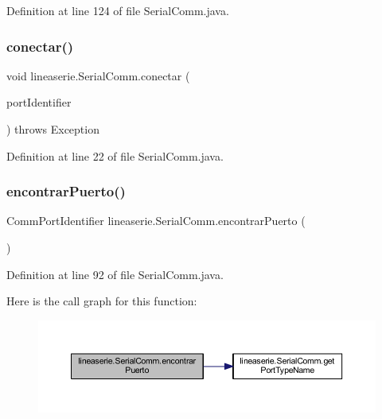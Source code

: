 Definition at line 124 of file Serial\+Comm.\+java.

\mbox{\label{classlineaserie_1_1_serial_comm_a877035aa389c7d3ceef75f1927afd4d5}} 
\subsubsection{\texorpdfstring{conectar()}{conectar()}}
{\footnotesize\ttfamily void lineaserie.\+Serial\+Comm.\+conectar (\begin{DoxyParamCaption}\item[{Comm\+Port\+Identifier}]{port\+Identifier }\end{DoxyParamCaption}) throws Exception}



Definition at line 22 of file Serial\+Comm.\+java.

\mbox{\label{classlineaserie_1_1_serial_comm_ac940f6b749e1137f5f1233b320e0e46f}} 
\subsubsection{\texorpdfstring{encontrar\+Puerto()}{encontrarPuerto()}}
{\footnotesize\ttfamily Comm\+Port\+Identifier lineaserie.\+Serial\+Comm.\+encontrar\+Puerto (\begin{DoxyParamCaption}{ }\end{DoxyParamCaption})}



Definition at line 92 of file Serial\+Comm.\+java.

Here is the call graph for this function\+:\nopagebreak
\begin{figure}[H]
\begin{center}
\leavevmode
\includegraphics[width=350pt]{classlineaserie_1_1_serial_comm_ac940f6b749e1137f5f1233b320e0e46f_cgraph}
\end{center}
\end{figure}
\mbox{\label{classlineaserie_1_1_serial_comm_aafba8fce6137b4b5a5e7795f07fef02c}} 
